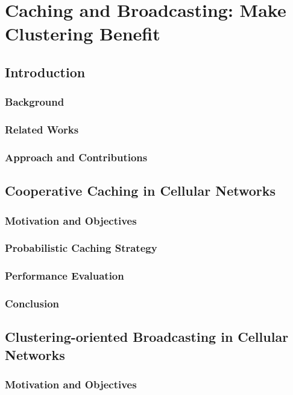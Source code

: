 
\chapter{Caching and Broadcasting: Make Clustering Benefit} %
\minitoc
\label{Chapter5} %

\section{Introduction}
\subsection{Background}
\subsection{Related Works}
\subsection{Approach and Contributions}
\section{Cooperative Caching in Cellular Networks}
\subsection{Motivation and Objectives}
\subsection{Probabilistic Caching Strategy}
\subsection{Performance Evaluation}
\subsection{Conclusion}
\section{Clustering-oriented Broadcasting in Cellular Networks}
\subsection{Motivation and Objectives}
